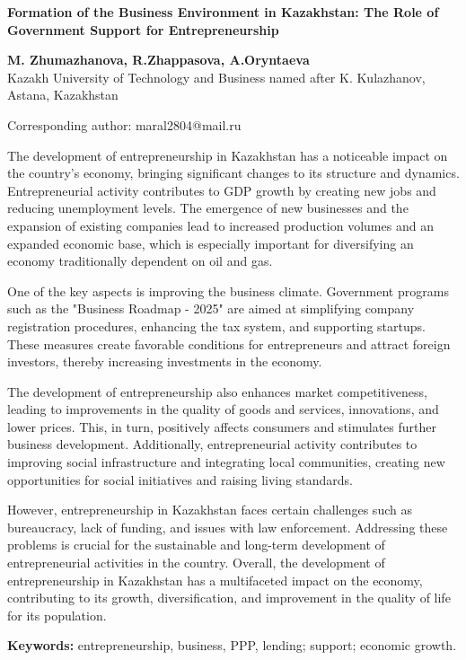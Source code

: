 


{\bfseries Formation of the Business Environment in Kazakhstan: The Role of
Government Support for Entrepreneurship}

{\bfseries M. Zhumazhanova\textsuperscript{\envelope }, R.Zhappasova, A.Oryntaeva\\
}Kazakh University of Technology and Business named after K. Kulazhanov,
Astana, Kazakhstan

\textsuperscript{\envelope }Corresponding author: maral2804@mail.ru

The development of entrepreneurship in Kazakhstan has a noticeable
impact on the country's economy, bringing significant changes to its
structure and dynamics. Entrepreneurial activity contributes to GDP
growth by creating new jobs and reducing unemployment levels. The
emergence of new businesses and the expansion of existing companies lead
to increased production volumes and an expanded economic base, which is
especially important for diversifying an economy traditionally dependent
on oil and gas.

One of the key aspects is improving the business climate. Government
programs such as the "Business Roadmap - 2025" are aimed at simplifying
company registration procedures, enhancing the tax system, and
supporting startups. These measures create favorable conditions for
entrepreneurs and attract foreign investors, thereby increasing
investments in the economy.

The development of entrepreneurship also enhances market
competitiveness, leading to improvements in the quality of goods and
services, innovations, and lower prices. This, in turn, positively
affects consumers and stimulates further business development.
Additionally, entrepreneurial activity contributes to improving social
infrastructure and integrating local communities, creating new
opportunities for social initiatives and raising living standards.

However, entrepreneurship in Kazakhstan faces certain challenges such as
bureaucracy, lack of funding, and issues with law enforcement.
Addressing these problems is crucial for the sustainable and long-term
development of entrepreneurial activities in the country. Overall, the
development of entrepreneurship in Kazakhstan has a multifaceted impact
on the economy, contributing to its growth, diversification, and
improvement in the quality of life for its population.

{\bfseries Keywords:} entrepreneurship, business, PPP, lending; support;
economic growth.

